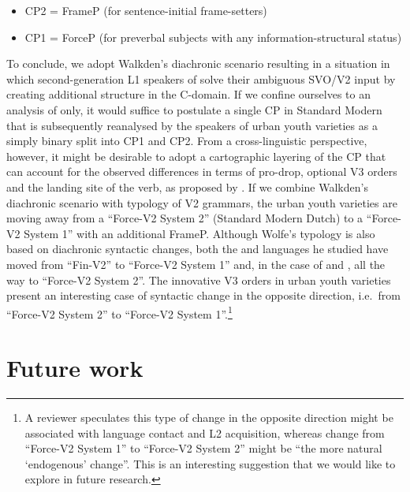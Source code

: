 \documentclass[output=paper]{langsci/langscibook}
\begin{document}
\begin{itemize}

    \item CP2 = FrameP (for sentence-initial frame-setters)

    \item CP1 = ForceP (for preverbal subjects with any information-structural
        status)

\end{itemize}

To conclude, we adopt Walkden's diachronic scenario resulting in a situation in
which second-generation L1 speakers of  solve their ambiguous SVO/V2 input
by creating additional structure in the C-domain. If we confine ourselves to an
analysis of  only, it would suffice to postulate a single CP in Standard
Modern  that is subsequently reanalysed by the speakers of urban youth
varieties as a simply binary split into CP1 and CP2. From a cross-linguistic
perspective, however, it might be desirable to adopt a cartographic layering of
the CP that can account for the observed differences in terms of pro-drop,
optional V3 orders and the landing site of the verb, as proposed by
\citet{Wolfe:2017}. If we combine Walkden's diachronic scenario with
 typology of V2 grammars, the  urban youth varieties are moving away
from a \enquote{Force-V2 System 2} (Standard Modern Dutch) to a \enquote{Force-V2 System 1}
with an additional FrameP. Although Wolfe's typology is also based on
diachronic syntactic changes,  both the  and  languages he
studied have moved from \enquote{Fin-V2} to \enquote{Force-V2 System 1} and, in
the case of  and , all the way to \enquote{Force-V2 System 2}. The
innovative V3 orders in urban youth varieties present an interesting case of
syntactic change in the opposite direction, i.e.\ from \enquote{Force-V2 System
    2} to \enquote{Force-V2 System 1}.\footnote{A reviewer speculates this type of
    change in the opposite direction might be associated with language contact
    and L2 acquisition, whereas change from \enquote{Force-V2 System 1} to
\enquote{Force-V2 System 2} might be ``the more natural `endogenous' change''.
This is an interesting suggestion that we would like to explore in future
research.}

\section{Future work}
\label{sec:fut}
\end{document}
